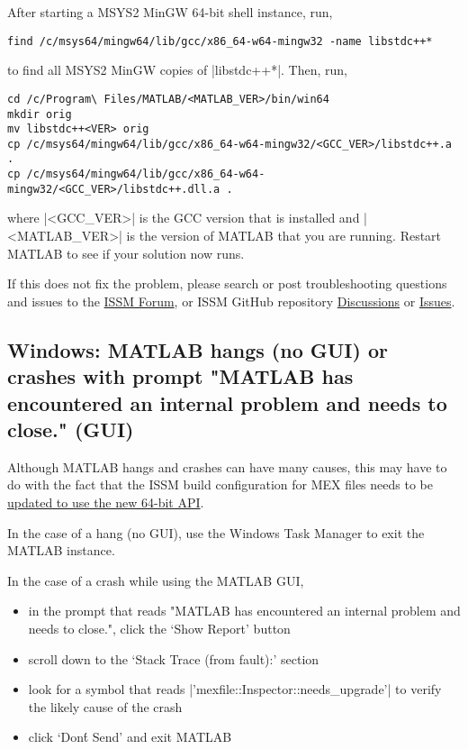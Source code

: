 After starting a MSYS2 MinGW 64-bit shell instance, run,
\begin{lstlisting}
find /c/msys64/mingw64/lib/gcc/x86_64-w64-mingw32 -name libstdc++*
\end{lstlisting}
to find all MSYS2 MinGW copies of \lstinlinebg|libstdc++*|. Then, run,
\begin{lstlisting}
cd /c/Program\ Files/MATLAB/<MATLAB_VER>/bin/win64
mkdir orig
mv libstdc++<VER> orig
cp /c/msys64/mingw64/lib/gcc/x86_64-w64-mingw32/<GCC_VER>/libstdc++.a .
cp /c/msys64/mingw64/lib/gcc/x86_64-w64-mingw32/<GCC_VER>/libstdc++.dll.a .
\end{lstlisting}
where \lstinlinebg|<GCC_VER>| is the GCC version that is installed and \lstinlinebg|<MATLAB_VER>| is the version of MATLAB that you are running. Restart MATLAB to see if your solution now runs.

If this does not fix the problem, please search or post troubleshooting questions and issues to the \href{https://issm.ess.uci.edu/forum/}{ISSM Forum}, or ISSM GitHub repository \href{https://github.com/ISSMteam/ISSM/discussions}{Discussions} or \href{https://github.com/ISSMteam/ISSM/issues}{Issues}.

\subsection*{Windows: MATLAB hangs (no GUI) or crashes with prompt "MATLAB has encountered an internal problem and needs to close." (GUI)}%
Although MATLAB hangs and crashes can have many causes, this may have to do with the fact that the ISSM build configuration for MEX files needs to be \href{https://www.mathworks.com/help/matlab/matlab_external/upgrading-mex-files-to-use-64-bit-api.html}{updated to use the new 64-bit API}.

In the case of a hang (no GUI), use the Windows Task Manager to exit the MATLAB instance.

In the case of a crash while using the MATLAB GUI,
\begin{itemize}
	\item  in the prompt that reads "MATLAB has encountered an internal problem and needs to close.", click the `Show Report' button
	\item scroll down to the `Stack Trace (from fault):' section
	\item look for a symbol that reads \lstinlinebg|'mexfile::Inspector::needs_upgrade'| to verify the likely cause of the crash
	\item click `Don\'t Send' and exit MATLAB
\end{itemize}

